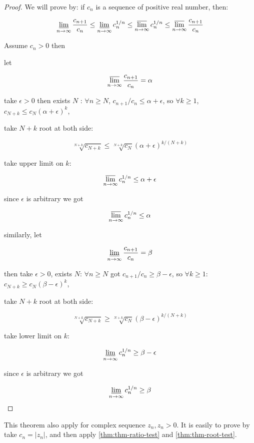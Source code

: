 \begin{proof}
We will prove by: if $c_n$ is a sequence of positive real number, then:


\begin{align*}
\varliminf_{n \to \infty}\frac{c_{n+1}}{c_n} \le \varliminf_{n \to \infty} c_n ^{1/n} \le \varlimsup_{n \to \infty} c_n ^{1/n} \le \varlimsup_{n \to \infty} \frac{c_{n+1}}{c_n}
\end{align*}

Assume $c_n > 0$ then

let 

\[
\varlimsup_{n \to \infty}\frac{c_{n+1}}{c_n} = \alpha
\]


take $\epsilon > 0$ then exists $N$ : $\forall n \ge N$, $c_{n+1}/c_n \le \alpha + \epsilon$,
so $\forall k \ge 1$, $c_{N+k} \le c_N (\alpha+\epsilon)^k$,

take $N+k$ root at both side:

\[ \sqrt[N+k]{c_{N+k}} \le \sqrt[N+k]{c_{N}} (\alpha+\epsilon)^{k/(N+k)} \]

take upper limit on $k$:

\[ \varlimsup_{n \to \infty}c_n^{1/n} \le \alpha + \epsilon \]

since $\epsilon$ is arbitrary we got

\[
\varlimsup_{n \to \infty}c_n^{1/n} \le \alpha
\]

similarly, let 

\[
\varliminf_{n \to \infty}\frac{c_{n+1}}{c_n} = \beta
\]

then take $\epsilon > 0$, exists $N$:  $\forall n \ge N$ got $c_{n+1}/c_n \ge \beta - \epsilon$,
so $\forall k \ge 1$: $c_{N+k} \ge c_N (\beta - \epsilon)^k$,

take $N+k$ root at both side:

\[ \sqrt[N+k]{c_{N+k}} \ge \sqrt[N+k]{c_{N}} {(\beta-\epsilon)}^{k/(N+k)} \]

take lower limit on $k$:

\[ \varliminf_{n \to \infty}c_n^{1/n} \ge \beta - \epsilon \]    


since $\epsilon$ is arbitrary we got

\[ \varliminf_{n \to \infty}c_n^{1/n} \ge \beta \]    
\end{proof}

\begin{corollary}
    This theorem also apply for complex sequence $z_n, z_n > 0$. 
    It is easily to prove by take $c_n = \lvert z_n \rvert$,
    and then apply \autoref{thm:thm-ratio-test} and \autoref{thm:thm-root-test}.
\end{corollary}

